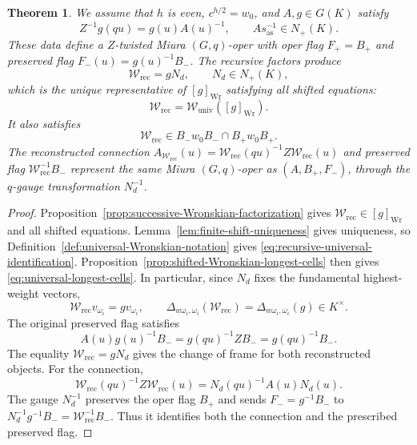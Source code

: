 \documentclass[11pt,leqno]{amsart}
\numberwithin{equation}{section}
\theoremstyle{plain}
\newtheorem{theorem}{Theorem}[section]
\theoremstyle{definition}
\theoremstyle{plain}
\theoremstyle{definition}
\theoremstyle{remark}
\begin{document}
\begin{theorem}\label{thm:universal-Wronskian-both-cells}
We assume that $h$ is even, $c^{h/2}=w_0$, and $A,g\in G(K)$ satisfy
\[
 Z^{-1}g(qu)=g(u)A(u)^{-1},\qquad
 As_{\mathrm{as}}^{-1}\in N_+(K).
\]
These data define a $Z$-twisted Miura $(G,q)$-oper with oper flag $F_+=B_+$ and preserved flag $F_-(u)=g(u)^{-1}B_-$.  The recursive factors produce
\begin{equation}\label{eq:universal-W-from-g}
 \mathscr W_{\mathrm{rec}}=gN_d,\qquad N_d\in N_+(K),
\end{equation}
which is the unique representative of $[g]_{\mathrm{Wr}}$ satisfying all shifted equations:
\begin{equation}\label{eq:recursive-universal-identification}
 \mathscr W_{\mathrm{rec}}=\mathscr W_{\mathrm{univ}}([g]_{\mathrm{Wr}}).
\end{equation}
It also satisfies
\begin{equation}\label{eq:universal-longest-cells}
 \mathscr W_{\mathrm{rec}}\in B_-w_0B_-\cap B_+w_0B_+.
\end{equation}
The reconstructed connection $A_{\mathscr W_{\mathrm{rec}}}(u)=\mathscr W_{\mathrm{rec}}(qu)^{-1}Z\mathscr W_{\mathrm{rec}}(u)$ and preserved flag $\mathscr W_{\mathrm{rec}}^{-1}B_-$ represent the same Miura $(G,q)$-oper as $(A,B_+,F_-)$, through the $q$-gauge transformation $N_d^{-1}$.
\end{theorem}
\begin{proof}
Proposition~\ref{prop:successive-Wronskian-factorization} gives $\mathscr W_{\mathrm{rec}}\in[g]_{\mathrm{Wr}}$ and all shifted equations.  Lemma~\ref{lem:finite-shift-uniqueness} gives uniqueness, so Definition~\ref{def:universal-Wronskian-notation} gives \eqref{eq:recursive-universal-identification}.  Proposition~\ref{prop:shifted-Wronskian-longest-cells} then gives \eqref{eq:universal-longest-cells}.  In particular, since $N_d$ fixes the fundamental highest-weight vectors,
\begin{equation}\label{eq:longest-cell-minor-locus}
 \mathscr W_{\mathrm{rec}}v_{\omega_i}=gv_{\omega_i},\qquad
 \Delta_{w\omega_i,\omega_i}(\mathscr W_{\mathrm{rec}})
 =\Delta_{w\omega_i,\omega_i}(g)\in K^\times.
\end{equation}
The original preserved flag satisfies
\[
 A(u)g(u)^{-1}B_-=g(qu)^{-1}Z B_-=g(qu)^{-1}B_-.
\]
The equality $\mathscr W_{\mathrm{rec}}=gN_d$ gives the change of frame for both reconstructed objects.  For the connection,
\begin{equation}\label{eq:recursive-same-qoper-class}
 \mathscr W_{\mathrm{rec}}(qu)^{-1}Z\mathscr W_{\mathrm{rec}}(u)
 =N_d(qu)^{-1}A(u)N_d(u).
\end{equation}
The gauge $N_d^{-1}$ preserves the oper flag $B_+$ and sends $F_-=g^{-1}B_-$ to $N_d^{-1}g^{-1}B_-=\mathscr W_{\mathrm{rec}}^{-1}B_-$.  Thus it identifies both the connection and the prescribed preserved flag.
\end{proof}
\end{document}
